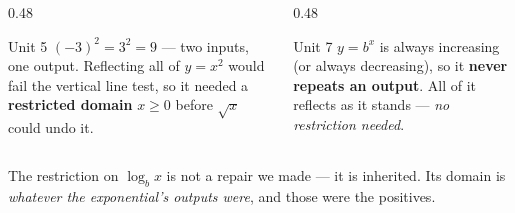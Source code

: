 \documentclass[aspectratio=169, 11pt]{beamer}
\begin{document}
\begin{frame}[t, plain]
  \begin{columns}[T]
    \begin{column}{0.48\textwidth}
      \begin{block}{Unit 5}
        $(-3)^2=3^2=9$ --- two inputs, one output. Reflecting all of $y=x^2$ would fail the vertical
        line test, so it needed a \textbf{restricted domain} $x\ge0$ before $\sqrt{x}$ could undo it.
      \end{block}
    \end{column}
    \begin{column}{0.48\textwidth}
      \begin{block}{Unit 7}
        $y=b^x$ is always increasing (or always decreasing), so it \textbf{never repeats an output}.
        All of it reflects as it stands --- \emph{no restriction needed}.
      \end{block}
    \end{column}
  \end{columns}
  \vspace{6pt}
  \begin{center}
    The restriction on $\log_b x$ is not a repair we made --- it is inherited. Its domain is
    \emph{whatever the exponential's outputs were}, and those were the positives.
  \end{center}
\end{frame}
\end{document}
